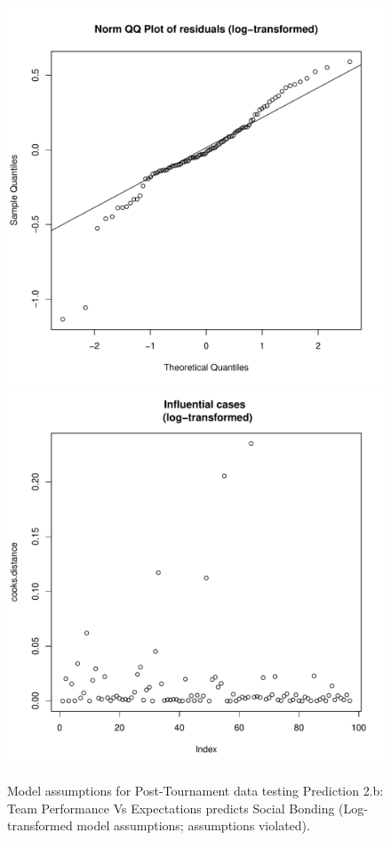 \begin{CJK}{UTF8}{gbsn}
\begin{figure}[htbp]
        \includegraphics[scale =.4]{images/MLM23bLogQQNorm.pdf}
        \includegraphics[scale =.4]{images/MLM23bLogCooksD.pdf}
        \caption{Model assumptions for Post-Tournament data testing Prediction 2.b: Team Performance Vs Expectations predicts Social Bonding (Log-transformed model assumptions; assumptions violated).}
        \label{fig:MLM3bLogAssumptions}
      \end{figure}



\end{CJK}

